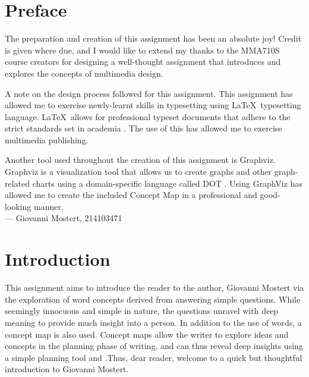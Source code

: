 \documentclass[a4paper,12pt]{article}
\begin{document}

\tableofcontents
\pagebreak


\section{Preface}
The preparation and creation of this assignment has been an absolute joy! Credit is given where due, and I would like to extend my thanks to the MMA710S course creators for designing a well-thought assignment that introduces and explores the concepts of multimedia design.

A note on the design process followed for this assignment. This assignment has allowed me to exercise newly-learnt skills in typesetting using \LaTeX \ typesetting language. \LaTeX \ allows for professional typeset documents that adhere to the strict standards set in academia \citep{latex}. The use of this has allowed me to exercise multimedia publishing.

Another tool used throughout the creation of this assignment is Graphviz. Graphviz is a visualization tool that allows us to create graphs and other graph-related charts using a domain-specific language called DOT \citep{graphviz}. Using GraphViz has allowed me to create the included Concept Map  in a professional and good-looking manner.
\\

\hspace{1 cm}
--- Giovanni Mostert, 214103471
\newpage

\section{Introduction}
This assignment aims to introduce the reader to the author, Giovanni Mostert via the exploration of word concepts derived from answering simple questions. While seemingly innocuous and simple in nature, the questions unravel with deep meaning to provide much insight into a person. In addition to the use of words, a concept map is also used. Concept maps allow the writer to explore ideas and concepts in the planning phase of writing, and can thus reveal deep insights using a simple planning tool \citep{novak:2008} and \citep{novak:2010}.Thus, dear reader, welcome to a quick but thoughtful introduction to Giovanni Mostert.
\end{document}
